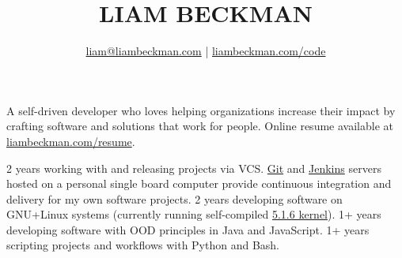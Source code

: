 


\title{\textcolor{my-red}{LIAM BECKMAN}}
\author{
    \textcolor{my-blue}{\href{mailto:liam@liambeckman.com}{liam@liambeckman.com}} | \textcolor{my-blue}{\href{https://liambeckman.com/code}{liambeckman.com/code}}
}

\date{\vspace{-5ex}}



\maketitle

\begin{center}
    A self-driven developer who loves helping organizations increase their impact by crafting software and solutions that work for people.
    Online resume available at \textcolor{my-blue}{\href{https://liambeckman.com/resume}{liambeckman.com/resume}}.
\end{center}





\vspace{-1em}
\begin{itemize}[label=$\triangleright$]
    2 years working with and releasing projects via VCS. \textcolor{my-blue}{\href{https://git.liambeckman.com/}{Git}} and \textcolor{my-blue}{\href{https://liambeckman.com/jenkins/blue/organizations/jenkins/pipelines/}{Jenkins}} servers hosted on a personal single board computer provide continuous integration and delivery for my own software projects.
    2 years developing software on GNU+Linux systems (currently running self-compiled \textcolor{my-blue}{\href{https://github.com/lbeckman314/dev/blob/master/config}{5.1.6 kernel}}).
    1+ years developing software with OOD principles in Java and JavaScript.
    1+ years scripting projects and workflows with Python and Bash.
\end{itemize}

\medbreak







\vfill


\pagebreak





